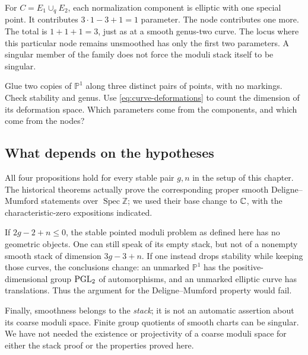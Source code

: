 \begin{Ex}
For $C=E_1\cup_qE_2$, each normalization component is elliptic
with one special point. It contributes
$3\cdot1-3+1=1$ parameter. The node contributes one more.
The total is $1+1+1=3$, just as at a smooth genus-two curve.
The locus where this particular node remains unsmoothed has
only the first two parameters. A singular member of the family
does not force the moduli stack itself to be singular.
\end{Ex}

\begin{Ej}\label{ex:curve-dimension}
Glue two copies of $\mathbb P^1$ along three distinct pairs of
points, with no markings. Check stability and genus. Use
\eqref{eq:curve-deformations} to count the dimension of its
deformation space. Which parameters come from the components,
and which come from the nodes?
\end{Ej}

\subsection{What depends on the hypotheses}

All four propositions hold for every stable pair $g,n$ in the
setup of this chapter. The historical theorems actually prove
the corresponding proper smooth Deligne--Mumford statements over
$\operatorname{Spec}\mathbb Z$; we used their base change to
$\mathbb C$, with the characteristic-zero expositions indicated.

If $2g-2+n\leq0$, the stable pointed moduli problem as defined
here has no geometric objects. One can still speak of its empty
stack, but not of a nonempty smooth stack of dimension $3g-3+n$.
If one instead drops stability while keeping those curves, the
conclusions change: an unmarked $\mathbb P^1$ has the
positive-dimensional group $\operatorname{PGL}_2$ of automorphisms, and an
unmarked elliptic curve has translations. Thus the argument for
the Deligne--Mumford property would fail.

Finally, smoothness belongs to the \emph{stack}; it is not an
automatic assertion about its coarse moduli space. Finite group
quotients of smooth charts can be singular. We have not needed
the existence or projectivity of a coarse moduli space for either
the stack proof or the properties proved here.
